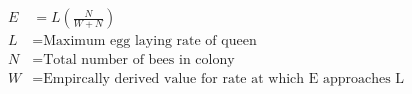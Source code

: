 \documentclass[ignorerest=true, border={0 3 3 3}]{standalone}
\begin{document}
\begin{align*}
E & = L \left(\frac{N}{W + N}\right) \nonumber \\
L & =  \text{Maximum egg laying rate of queen} \nonumber \\
N & =  \text{Total number of bees in colony} \nonumber \\
W & =  \text{Empircally derived value for rate at which E approaches L} \nonumber \\
\end{align*} 
\end{document}
